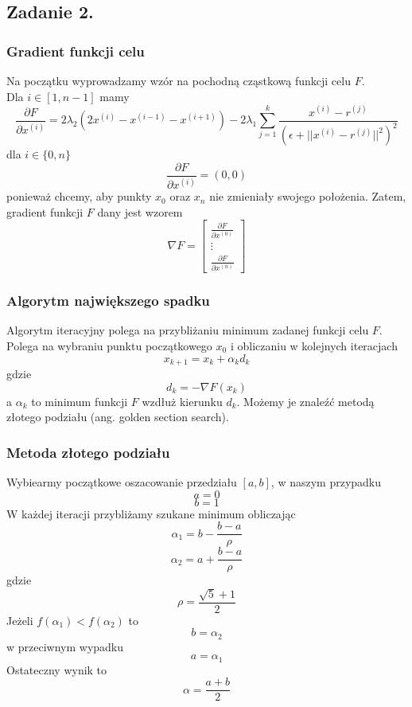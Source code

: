 \documentclass[11pt, leqno]{scrartcl}
\begin{document}
    \subsection{Zadanie 2.}
    \subsubsection{Gradient funkcji celu}
    Na początku wyprowadzamy wzór na pochodną cząstkową funkcji
    celu $F$. \\
    Dla $i \in [1,n-1]$ mamy
    \[
        \frac{\partial F}{\partial x^{(i)}}=2\lambda _2
            (2x^{(i)}-x^{(i-1)}-x^{(i+1)})-2\lambda _1\sum_{j=1}^{k}
            \frac{x^{(i)}-r^{(j)}}{(\epsilon +
            ||x^{(i)}-r^{(j)}||^2)^2}
    \]
    dla $i \in \{ 0,n \}$
    \[
        \frac{\partial F}{\partial x^{(i)}} = (0,0)
    \]
    ponieważ chcemy, aby punkty $x_0$ oraz $x_n$ nie zmieniały
    swojego położenia.
    Zatem, gradient funkcji $F$ dany jest wzorem
    \[
        \nabla F=
        \begin{bmatrix}
            \frac{\partial F}{\partial x^{(0)}} \\
            \vdots \\
            \frac{\partial F}{\partial x^{(n)}}
        \end{bmatrix}
    \]

    \subsubsection{Algorytm największego spadku}
    Algorytm iteracyjny polega na przybliżaniu minimum zadanej
    funkcji celu $F$. Polega na wybraniu punktu początkowego
    $x_0$ i obliczaniu w kolejnych iteracjach
    \[
        x_{k+1}=x_k+\alpha _kd_k
    \]
    gdzie
    \[
        d_k=-\nabla F(x_k)
    \]
    a $\alpha _k$ to minimum funkcji $F$ wzdłuż kierunku $d_k$.
    Możemy je znaleźć metodą złotego podziału (ang. golden section
    search).

    \subsubsection{Metoda złotego podziału}
    Wybiearmy początkowe oszacowanie przedziału $[a,b]$, w naszym
    przypadku
    \[
        a=0
    \]
    \[
        b=1
    \]
    W każdej iteracji przybliżamy szukane minimum obliczając
    \[
        \alpha _1=b-\frac{b-a}{\rho}
    \]
    \[
        \alpha _2=a+\frac{b-a}{\rho}
    \]
    gdzie
    \[
        \rho =\frac{\sqrt{5}+1}{2}
    \]
    Jeżeli $f(\alpha _1)<f(\alpha _2)$ to
    \[
        b=\alpha _2
    \]
    w przeciwnym wypadku
    \[
        a=\alpha _1
    \]
    Ostateczny wynik to
    \[
        \alpha =\frac{a+b}{2}
    \]
\end{document}
